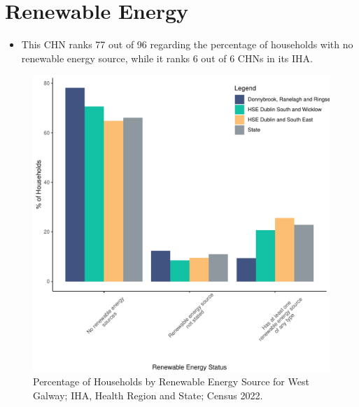 \documentclass{article}
\begin{document}
\section{Renewable Energy}\label{sect:RE}
\begin{itemize}
\item This CHN ranks  77 out of 96 regarding the percentage of households with no renewable energy source, while it ranks   6 out of 6 CHNs in its IHA.
\end{itemize}
\begin{figure}[H]
	\centering
	\includegraphics[width = 140mm]{../figures/RenewableEnergyED.pdf}
	\caption{Percentage of Households by Renewable Energy Source for West Galway; IHA, Health Region and State; Census 2022.}
	\label{fig:vbnv}
	\end{figure}
\end{document}
